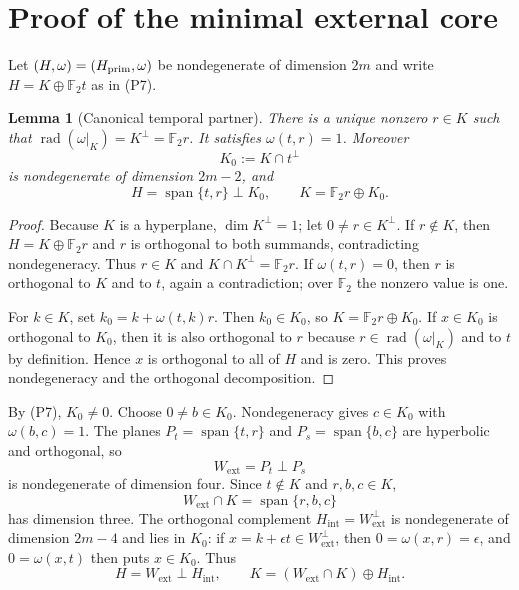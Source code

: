 \documentclass[11pt]{article}
\newtheorem{lemma}[theorem]{Lemma}
\theoremstyle{definition}
\theoremstyle{remark}
\newcommand{\F}{\mathbb F}
\newcommand{\rad}{\operatorname{rad}}
\newcommand{\ext}{\mathrm{ext}}
\newcommand{\intr}{\mathrm{int}}
\newcommand{\Span}{\operatorname{span}}
\begin{document}
\section{Proof of the minimal external core}
\label{app:proof-external-core}

Let $(H,\omega)=(H_{\rm prim},\omega)$ be nondegenerate of dimension $2m$ and
write $H=K\oplus\F_2t$ as in \textup{(P7)}.

\begin{lemma}[Canonical temporal partner]
\label{lem:app-temporal-partner}
There is a unique nonzero $r\in K$ such that
$\rad(\omega|_K)=K^\perp=\F_2r$.  It satisfies $\omega(t,r)=1$.  Moreover
\[
 K_0:=K\cap t^\perp
\]
is nondegenerate of dimension $2m-2$, and
\[
  H=\Span\{t,r\}\perp K_0,
  \qquad K=\F_2r\oplus K_0.
\]
\end{lemma}

\begin{proof}
Because $K$ is a hyperplane, $\dim K^\perp=1$; let $0\ne r\in K^\perp$.  If
$r\notin K$, then $H=K\oplus\F_2r$ and $r$ is orthogonal to both summands,
contradicting nondegeneracy.  Thus $r\in K$ and
$K\cap K^\perp=\F_2r$.  If $\omega(t,r)=0$, then $r$ is orthogonal to $K$ and
to $t$, again a contradiction; over $\F_2$ the nonzero value is one.

For $k\in K$, set $k_0=k+\omega(t,k)r$.  Then $k_0\in K_0$, so
$K=\F_2r\oplus K_0$.  If $x\in K_0$ is orthogonal to $K_0$, then it is also
orthogonal to $r$ because $r\in\rad(\omega|_K)$ and to $t$ by definition.
Hence $x$ is orthogonal to all of $H$ and is zero.  This proves nondegeneracy and
the orthogonal decomposition.
\end{proof}

By \textup{(P7)}, $K_0\ne0$.  Choose $0\ne b\in K_0$.  Nondegeneracy gives
$c\in K_0$ with $\omega(b,c)=1$.  The planes
$P_t=\Span\{t,r\}$ and $P_s=\Span\{b,c\}$ are hyperbolic and orthogonal, so
\[
 W_{\ext}=P_t\perp P_s
\]
is nondegenerate of dimension four.  Since $t\notin K$ and $r,b,c\in K$,
\[
 W_{\ext}\cap K=\Span\{r,b,c\}
\]
has dimension three.  The orthogonal complement
$H_{\intr}=W_{\ext}^\perp$ is nondegenerate of dimension $2m-4$ and lies in
$K_0$: if $x=k+\epsilon t\in W_{\ext}^\perp$, then
$0=\omega(x,r)=\epsilon$, and $0=\omega(x,t)$ then puts $x\in K_0$.
Thus
\[
 H=W_{\ext}\perp H_{\intr},
 \qquad
 K=(W_{\ext}\cap K)\oplus H_{\intr}.
\]
\end{document}
